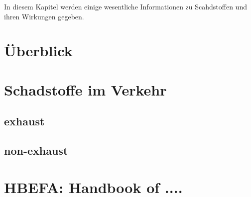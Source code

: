 

In diesem Kapitel werden einige wesentliche Informationen zu Scahdstoffen und ihren Wirkungen gegeben.

\section{Überblick}
\label{gl-schadstoffe-Überblick:sec}


\section{Schadstoffe im Verkehr}
\label{gl-schadstoffe-Verkehr:sec}


\subsection{exhaust}
\label{gl-schadstoffe-Verkehr-sec:exhaust}


\subsection{non-exhaust}
\label{gl-schadstoffe-Verkehr-sec-non-exhaust}


\section[HBEFA]{HBEFA: Handbook of ....}
\label{gl-schadstoffe-HBEFA:sec}

